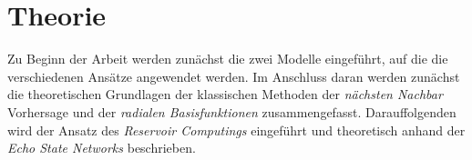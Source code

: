 \chapter{Theorie}
\label{ch:theory}

Zu Beginn der Arbeit werden zunächst die zwei Modelle eingeführt, auf die die verschiedenen Ansätze angewendet werden. Im Anschluss daran werden zunächst die theoretischen Grundlagen der klassischen Methoden der \textit{nächsten Nachbar} Vorhersage und der \textit{radialen Basisfunktionen} zusammengefasst. Darauffolgenden wird der Ansatz des \textit{Reservoir Computings} eingeführt und theoretisch anhand der \textit{Echo State Networks} beschrieben.







